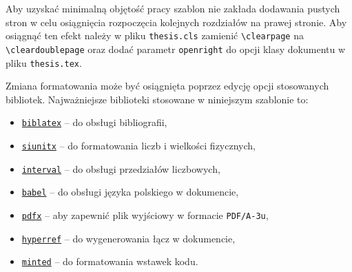 Aby uzyskać minimalną objętość pracy szablon nie zakłada dodawania pustych stron w celu osiągnięcia rozpoczęcia kolejnych rozdziałów na prawej stronie. Aby osiągnąć ten efekt należy w pliku \texttt{thesis.cls} zamienić \verb|\clearpage| na \verb|\cleardoublepage| oraz dodać parametr \texttt{openright} do opcji klasy dokumentu w pliku \texttt{thesis.tex}.

Zmiana formatowania może być osiągnięta poprzez edycję opcji stosowanych bibliotek. Najważniejsze biblioteki stosowane w niniejszym szablonie to:
\begin{itemize}
\item \texttt{\href{https://ctan.org/pkg/biblatex}{biblatex}} -- do obsługi bibliografii,
\item \texttt{\href{https://ctan.org/pkg/siunitx}{siunitx}} -- do formatowania liczb i wielkości fizycznych,
\item \texttt{\href{https://ctan.org/pkg/interval}{interval}} -- do obsługi przedziałów liczbowych,
\item \texttt{\href{https://ctan.org/pkg/babel-polish}{babel}} -- do obsługi języka polskiego w dokumencie,
\item \texttt{\href{https://ctan.org/pkg/pdfx}{pdfx}} -- aby zapewnić plik wyjściowy w formacie \texttt{PDF/A-3u},
\item \texttt{\href{https://ctan.org/pkg/hyperref}{hyperref}} -- do wygenerowania łącz w dokumencie,
\item \texttt{\href{https://ctan.org/pkg/minted}{minted}} -- do formatowania wstawek kodu.
\end{itemize}

